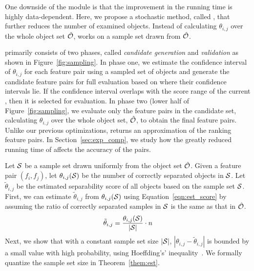 One downside of the \earlyT module
is that the improvement in the running time is highly data-dependent.
Here, we propose a stochastic method, called \sampling,
that further reduces the number of examined objects.
Instead of calculating $\theta_{i,j}$ over the
whole object set $\hat{{\mathcal{O}}}$, \sampling works on a
sample set drawn from $\hat{{\mathcal{O}}}$.

 \sampling primarily consists of two phases,
called {\em candidate generation} and {\em validation}
as shown in Figure~\ref{fig:sampling}.
In phase one, we estimate the confidence interval of $\theta_{i,j}$
for each feature pair using a sampled set of objects and
generate the candidate feature pairs for full evaluation
based on where their confidence intervals lie.
If the confidence interval overlaps with the
score range of the current \topk, then it is selected for evaluation.
In phase two (lower half of Figure~\ref{fig:sampling},
we evaluate only the feature pairs in the candidate set,
calculating $\theta_{i,j}$ over the whole object set, $\hat{{\mathcal{O}}}$,
to obtain the final \topk feature pairs.
Unlike our previous optimizations, \sampling returns
an approximation of the \topk ranking feature pairs.
In Section~\ref{sec:exp_comp}, we study how the greatly
reduced running time of \sampling affects the accuracy of the \topk pairs. %



Let ${\mathcal{S}}$ be a sample set drawn uniformly from the object set $\hat{{\mathcal{O}}}$. Given a feature pair $(f_i,f_j)$, let $\theta_{i,j}({\mathcal{S}})$ be the number of correctly separated objects in ${\mathcal{S}}$. Let $\tilde{\theta}_{i,j}$ be the estimated separability score of all objects based on the sample set ${\mathcal{S}}$. First, we can estimate $\tilde{\theta}_{i,j}$ from $\theta_{i,j}({\mathcal{S}})$ using Equation~\ref{eqn:est_score} by assuming the ratio of correctly separated samples in ${\mathcal{S}}$ is the same as that in $\hat{{\mathcal{O}}}$.
\begin{equation}\label{eqn:est_score}
\tilde{\theta}_{i,j} = \frac{\theta_{i,j}({\mathcal{S}})}{|{\mathcal{S}}|} \cdot n
\end{equation}
\noindent Next, we show that with a constant sample set size $|{\mathcal{S}}|$, $|\theta_{i,j}-\tilde{\theta}_{i,j}|$ is bounded by a small value with high probability, using Hoeffding's' inequality~\cite{hoeffding1963probability}. We formally quantize the sample set size in Theorem~\ref{them:est}.

